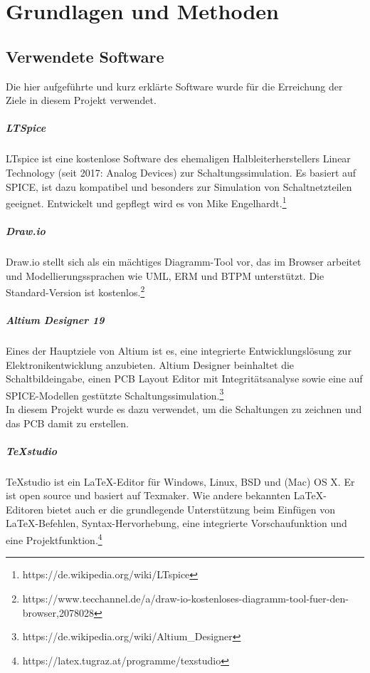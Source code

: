 \documentclass[paper=a4, 12pt]{scrreprt}
\begin{document}
\chapter{Grundlagen und Methoden}\hfill \break
	\section{Verwendete Software}\hfill \break
	Die hier aufgeführte und kurz erklärte Software wurde für die Erreichung der Ziele in diesem Projekt verwendet.
	
	\paragraph{LTSpice}\hfill \break
	LTspice ist eine kostenlose Software des ehemaligen Halbleiterherstellers Linear Technology (seit 2017: Analog Devices) zur Schaltungssimulation. Es basiert auf SPICE, ist dazu kompatibel und besonders zur Simulation von Schaltnetzteilen geeignet. Entwickelt und gepflegt wird es von Mike Engelhardt.\footnote{https://de.wikipedia.org/wiki/LTspice}
	\paragraph{Draw.io}\hfill \break
	Draw.io stellt sich als ein mächtiges Diagramm-Tool vor, das im Browser arbeitet und Modellierungssprachen wie UML, ERM und BTPM unterstützt. Die Standard-Version ist kostenlos.\footnote{https://www.tecchannel.de/a/draw-io-kostenloses-diagramm-tool-fuer-den-browser,2078028}
	\paragraph{Altium Designer 19}\hfill \break
	Eines der Hauptziele von Altium ist es, eine integrierte Entwicklungslösung zur Elektronikentwicklung anzubieten.
	Altium Designer beinhaltet die Schaltbildeingabe, einen PCB Layout Editor mit Integritätsanalyse sowie eine auf SPICE-Modellen gestützte Schaltungssimulation.\footnote{https://de.wikipedia.org/wiki/Altium\_Designer}\\
	In diesem Projekt wurde es dazu verwendet, um die Schaltungen zu zeichnen und das PCB damit zu erstellen.
	\paragraph{TeXstudio}\hfill \break
	TeXstudio ist ein LaTeX-Editor für Windows, Linux, BSD und (Mac) OS X. Er ist open source und basiert auf Texmaker. Wie andere bekannten LaTeX-Editoren bietet auch er die grundlegende Unterstützung beim Einfügen von LaTeX-Befehlen, Syntax-Hervorhebung, eine integrierte Vorschaufunktion und eine Projektfunktion.\footnote{https://latex.tugraz.at/programme/texstudio}
\end{document}
